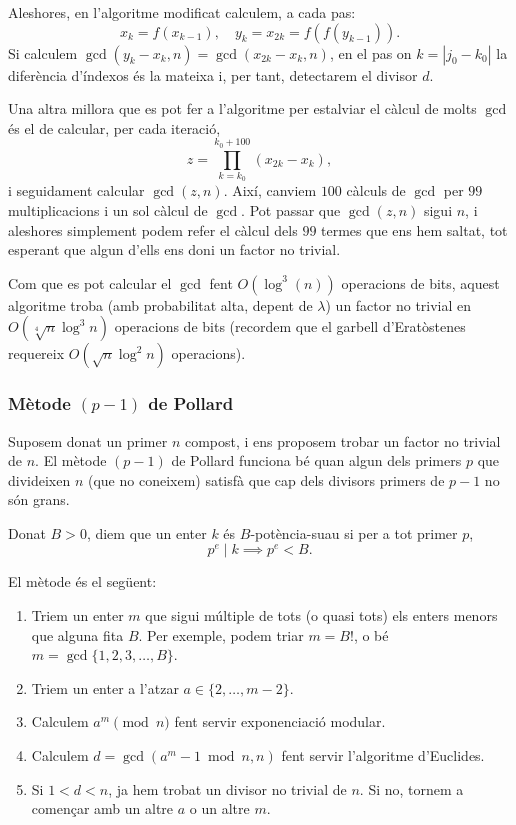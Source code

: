  Aleshores, en l'algoritme modificat calculem, a cada pas:
 \[
 x_k = f(x_{k-1}),\quad y_k=x_{2k}=f(f(y_{k-1})).
 \]
 Si calculem $\gcd(y_k-x_k,n)=\gcd(x_{2k}-x_{k},n)$, en el pas on $k=|j_0 - k_0|$ la diferència d'índexos és la mateixa i, per tant, detectarem el divisor $d$.

Una altra millora que es pot fer a l'algoritme per estalviar el càlcul de molts $\gcd$ és el de calcular, per cada iteració,
\[
z=\prod_{k=k_0}^{k_0+100} (x_{2k}-x_k),
\]
i seguidament calcular $\gcd(z,n)$. Així, canviem $100$ càlculs de $\gcd$ per $99$ multiplicacions i un sol càlcul de $\gcd$. Pot passar que $\gcd(z,n)$ sigui $n$, i aleshores simplement podem refer el càlcul dels $99$ termes que ens hem saltat, tot esperant que algun d'ells ens doni un factor no trivial.

Com que es pot calcular el $\gcd$ fent $O(\log^3(n))$ operacions de bits, aquest algoritme troba (amb probabilitat alta, depent de $\lambda$) un factor no trivial en $O(\sqrt[4]{n}\log^3 n)$ operacions de bits (recordem que el garbell d'Eratòstenes requereix $O(\sqrt{n}\log^2 n)$ operacions).
 \subsubsection{Mètode \texorpdfstring{$(p-1)$}{(p-1)} de Pollard}
 
 Suposem donat un primer $n$ compost, i ens proposem trobar un factor no trivial de $n$. El mètode $(p-1)$ de Pollard funciona bé quan algun dels primers $p$ que divideixen $n$ (que no coneixem) satisfà que cap dels divisors primers de $p-1$ no són grans.
 
 \begin{definition}
 Donat $B>0$, diem que un enter $k$ és $B$-potència-suau si per a tot primer $p$,
 \[
 p^e\mid k\implies p^e < B.
 \]
 \end{definition}
 
 El mètode és el següent:
 
 \begin{enumerate}
     \item Triem un enter $m$ que sigui múltiple de tots (o quasi tots) els enters menors que alguna fita $B$. Per exemple, podem triar $m=B!$, o bé $m=\gcd\{1,2,3,\ldots,B\}$.
     \item Triem un enter a l'atzar $a\in \{2,\ldots,m-2\}$.
     \item Calculem $a^m\pmod{n}$ fent servir exponenciació modular.
     \item Calculem $d=\gcd(a^m-1\bmod n,n)$ fent servir l'algoritme d'Euclides.
     \item Si $1<d<n$, ja hem trobat un divisor no trivial de $n$. Si no, tornem a començar amb un altre $a$ o un altre $m$.
 \end{enumerate}
 
